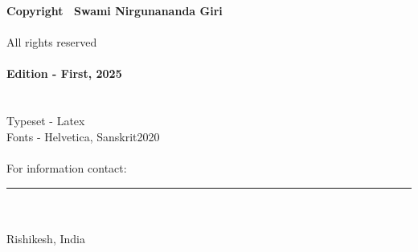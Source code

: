 \thispagestyle{empty} 
\arialUC 
{\textbf{Copyright \textcopyright\ Swami Nirgunananda Giri}}\\
\\
All rights reserved\\
\\
\textbf{Edition - First, 2025}\\
\\
\vspace{1cm}\\
Typeset - Latex\\
Fonts - Helvetica, Sanskrit2020\\
\vspace{1cm}\\
For information contact: \textbf{}\\
\vfill
\rule{\textwidth}{2pt}
\emph{}\\
\\
Rishikesh, India\\
\newpage